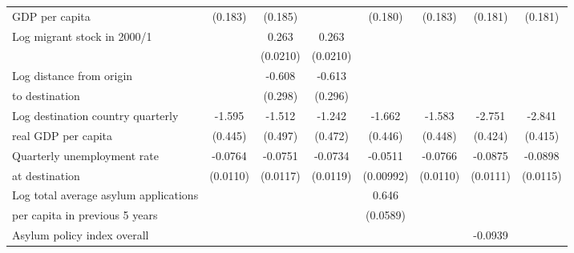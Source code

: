 \begin{table}[htbp]
\begin{tabular}{l*{7}{c}}
  GDP per capita                   &     (0.183)         &     (0.185)         &                     &     (0.180)         &     (0.183)         &     (0.181)         &     (0.181)         \\
[0.5em]
Log migrant stock in 2000/1&                     &       0.263\sym{***}&       0.263\sym{***}&                     &                     &                     &                     \\
                    &                     &    (0.0210)         &    (0.0210)         &                     &                     &                     &                     \\
[0.5em]
Log distance from origin &                     &      -0.608\sym{*}  &      -0.613\sym{*}  &                     &                     &                     &                     \\
to destination                    &                     &     (0.298)         &     (0.296)         &                     &                     &                     &                     \\
[0.5em]
Log destination country quarterly &      -1.595\sym{***}&      -1.512\sym{**} &      -1.242\sym{*}  &      -1.662\sym{***}&      -1.583\sym{***}&      -2.751\sym{***}&      -2.841\sym{***}\\
real GDP per capita                    &     (0.445)         &     (0.497)         &     (0.472)         &     (0.446)         &     (0.448)         &     (0.424)         &     (0.415)         \\
[0.5em]
Quarterly unemployment rate &     -0.0764\sym{***}&     -0.0751\sym{***}&     -0.0734\sym{***}&     -0.0511\sym{***}&     -0.0766\sym{***}&     -0.0875\sym{***}&     -0.0898\sym{***}\\
at destination                    &    (0.0110)         &    (0.0117)         &    (0.0119)         &   (0.00992)         &    (0.0110)         &    (0.0111)         &    (0.0115)         \\
[0.5em]
Log total average asylum applications &                     &                     &                     &       0.646\sym{***}&                     &                     &                     \\
per capita in previous 5 years                    &                     &                     &                     &    (0.0589)         &                     &                     &                     \\
[0.5em]
Asylum policy index overall&                     &                     &                     &                     &                     &     -0.0939\sym{***}&                     \\

\end{tabular}
\end{table}
